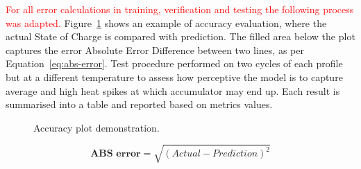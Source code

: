 

%
\textcolor{red}{For all error calculations in training, verification and testing the following process was adapted.}
Figure~\ref{fig:plot_demo} shows an example of accuracy evaluation, where the actual State of Charge is compared with prediction.
The filled area below the plot captures the error Absolute Error Difference between two lines, as per Equation~\ref{eq:abs-error}.
Test procedure performed on two cycles of each profile but at a different temperature to assess how perceptive the model is to capture average and high heat spikes at which accumulator may end up.
Each result is summarised into a table and reported based on metrics values.
\begin{figure}[ht]
    \centering
    
    \caption{Accuracy plot demonstration.}
    \label{fig:plot_demo}
\end{figure}
\begin{equation}
    \textbf{ABS error}  = \sqrt{(Actual-Prediction)^2}
    \label{eq:abs-error}
\end{equation}
%
%
%

